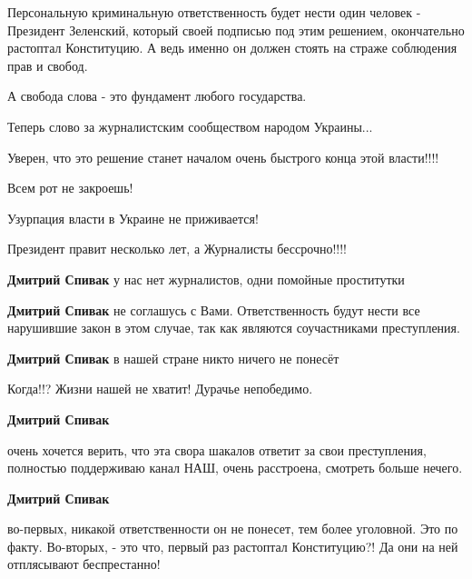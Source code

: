  
 
 
 
 
\zzSecCmt

\begin{itemize} %

Персональную криминальную ответственность будет нести один человек - Президент
Зеленский, который своей подписью под этим решением, окончательно растоптал
Конституцию. А ведь именно он должен стоять на страже соблюдения прав и свобод.

А свобода слова - это фундамент любого государства.

Теперь слово за журналистским сообществом народом Украины...

Уверен, что это решение станет началом очень быстрого конца этой власти!!!!

Всем рот не закроешь!

Узурпация власти в Украине не приживается!

Президент правит несколько лет, а Журналисты бессрочно!!!!

\begin{itemize} %
\textbf{Дмитрий Спивак} у нас нет журналистов, одни помойные проститутки

\textbf{Дмитрий Спивак} не соглашусь с Вами. Ответственность будут нести все нарушившие закон в этом случае, так как являются соучастниками преступления.

\textbf{Дмитрий Спивак} в нашей стране никто ничего не понесёт

Когда!!? Жизни нашей не хватит! Дурачье непобедимо.

\textbf{Дмитрий Спивак} 

очень хочется верить, что эта свора шакалов ответит за свои преступления,
полностью поддерживаю канал НАШ, очень расстроена, смотреть больше нечего.

\textbf{Дмитрий Спивак} 

во-первых, никакой ответственности он не понесет, тем более уголовной. Это по
факту. Во-вторых, - это что, первый раз растоптал Конституцию?! Да они на ней
отплясывают беспрестанно!


\end{itemize}
\end{itemize}
